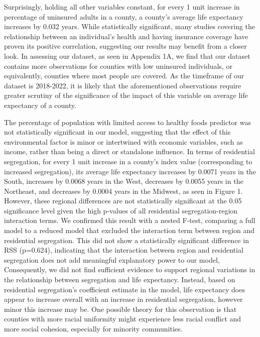 \documentclass[
  10pt,
  letterpaper,
  DIV=11,
  numbers=noendperiod]{scrartcl}
\begin{document}
Surprisingly, holding all other variables constant, for every 1 unit
increase in percentage of uninsured adults in a county, a county's
average life expectancy increases by 0.032 years. While statistically
significant, many studies covering the relationship between an
individual's health and having insurance coverage have proven its
positive correlation, suggesting our results may benefit from a closer
look. In assessing our dataset, as seen in Appendix 1A, we find that our
dataset contains more observations for counties with low uninsured
individuals, or equivalently, counties where most people are covered. As
the timeframe of our dataset is 2018-2022, it is likely that the
aforementioned observations require greater scrutiny of the significance
of the impact of this variable on average life expectancy of a county.~

The percentage of population with limited access to healthy foods
predictor was not statistically significant in our model, suggesting
that the effect of this environmental factor is minor or intertwined
with economic variables, such as income, rather than being a direct or
standalone influence. In terms of residential segregation, for every 1
unit increase in a county's index value (corresponding to increased
segregation), its average life expectancy increases by 0.0071 years in
the South, increases by 0.0068 years in the West, decreases by 0.0055
years in the Northeast, and decreases by 0.0004 years in the Midwest, as
seen in Figure 1. However, these regional differences are not
statistically significant at the 0.05 significance level given the high
p-values of all residential segregation-region interaction terms. We
confirmed this result with a nested F-test, comparing a full model to a
reduced model that excluded the interaction term between region and
residential segregation. This did not show a statistically significant
difference in RSS (p=0.624), indicating that the interaction between
region and residential segregation does not add meaningful explanatory
power to our model, Consequently, we did not find sufficient evidence to
support regional variations in the relationship between segregation and
life expectancy. Instead, based on residential segregation's coefficient
estimate in the model, life expectancy does appear to increase overall
with an increase in residential segregation, however minor this increase
may be. One possible theory for this observation is that counties with
more racial uniformity might experience less racial conflict and more
social cohesion, especially for minority communities.
\end{document}
